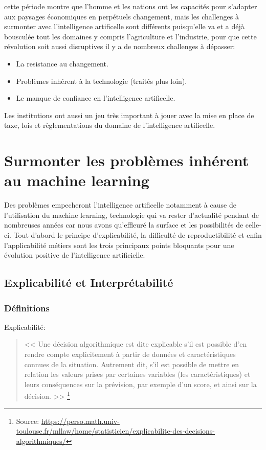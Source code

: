     cette période montre que l'homme et les nations ont les capacités pour s'adapter 
    aux paysages économiques en perpétuels changement, mais les challenges à surmonter 
    avec l'intelligence artificelle sont différents puisqu'elle va et a déjà bousculée tout 
    les domaines y compris l'agriculture et l'industrie, pour que cette 
    révolution soit aussi disruptives il y a de nombreux challenges à dépasser:
    \newline

    \begin{itemize}
        \item La resistance au changement.
        \item Problèmes inhérent à la technologie (traités plus loin).
        \item Le manque de confiance en l'intelligence artificelle. \newline
    \end{itemize}

    Les institutions ont aussi un jeu très important à jouer avec la mise en place 
    de taxe, lois et règlementations du domaine de l'intelligence artificelle.

    \chapter{Surmonter les problèmes inhérent au machine learning }
        Des problèmes empecheront l'intelligence artificelle notamment à cause de l'utilisation 
        du machine learning, technologie qui va rester d'actualité pendant de nombreuses années car nous
        avons qu'effleuré la surface et les possibilités de celle-ci.
        Tout d'abord le principe d'explicabilité, la difficulté de reproductibilité et enfin l'applicabilité 
        métiers sont les trois principaux points bloquants pour une évolution positive de 
        l'intelligence artificielle. \newline

        \section{Explicabilité et Interprétabilité}
            \subsection*{Définitions}
            Explicabilité: 
            \begin{quote}
                << Une décision algorithmique est dite explicable s’il est possible d’en rendre compte 
                explicitement à partir de données et caractéristiques connues de la situation. 
                Autrement dit, s’il est possible de mettre en relation les valeurs prises 
                par certaines variables (les caractéristiques) et leurs conséquences  
                sur la prévision, par exemple d’un score, et ainsi sur la décision. >>
                \footnote{Source: \url{https://perso.math.univ-toulouse.fr/mllaw/home/statisticien/explicabilite-des-decisions-algorithmiques/}}
                \newline 
            \end{quote}

